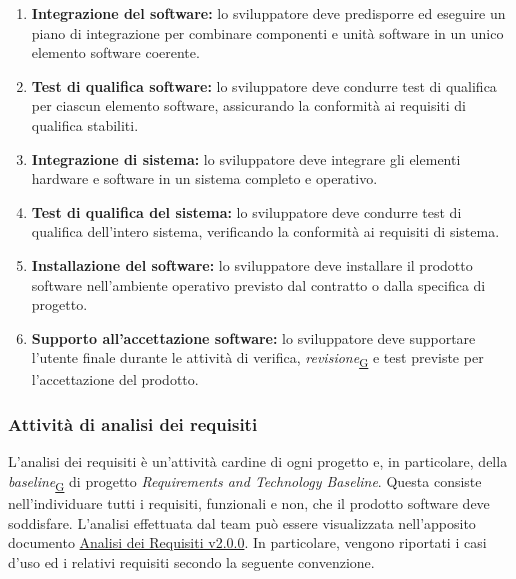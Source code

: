 \documentclass[a4paper,12pt]{article}
\begin{document}
{{{\begin{enumerate}
                \item \textbf{Integrazione del software:} lo sviluppatore deve predisporre ed eseguire un piano di integrazione per combinare componenti e unità software in un unico elemento software coerente.
                \item \textbf{Test di qualifica software:} lo sviluppatore deve condurre test di qualifica per ciascun elemento software, assicurando la conformità ai requisiti di qualifica stabiliti.
                \item \textbf{Integrazione di sistema:} lo sviluppatore deve integrare gli elementi hardware e software in un sistema completo e operativo.
                \item \textbf{Test di qualifica del sistema:} lo sviluppatore deve condurre test di qualifica dell'intero sistema, verificando la conformità ai requisiti di sistema.
                \item \textbf{Installazione del software:} lo sviluppatore deve installare il prodotto software nell'ambiente operativo previsto dal contratto o dalla specifica di progetto.
                \item \textbf{Supporto all'accettazione software:} lo sviluppatore deve supportare l'utente finale durante le attività di verifica, \textit{revisione}\textsubscript{\href{https://atlasteam9.github.io/Atlas/glossario.html\#Revisione}{G}} e test previste per l'accettazione del prodotto.
            \end{enumerate}
        }

        \subsubsection{Attività di analisi dei requisiti}{
            L'analisi dei requisiti è un'attività cardine di ogni progetto e, in particolare, della \textit{baseline}\textsubscript{\href{https://atlasteam9.github.io/Atlas/glossario.html\#Baseline}{G}} di progetto \textit{Requirements and Technology Baseline}. Questa consiste nell'individuare tutti i requisiti, funzionali e non, che il prodotto software deve soddisfare. L'analisi effettuata dal team può essere visualizzata nell'apposito documento \href{https://atlasteam9.github.io/Atlas/docs/PB/documenti/esterni/Analisi%20dei%20Requisiti.pdf}{Analisi dei Requisiti v2.0.0}.
            \newline
            In particolare, vengono riportati i casi d'uso ed i relativi requisiti secondo la seguente convenzione.
            
}}}
\end{document}
